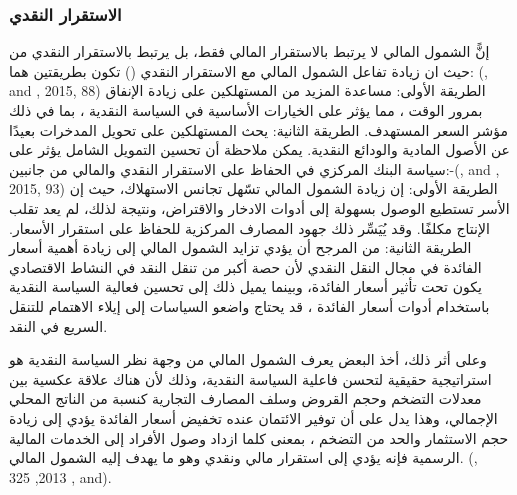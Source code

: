 \documentclass[10pt,a4paper]{report}
\begin{document}
\begin{doublespacing}
\subsubsection{الاستقرار النقدي}
إنًّ الشمول المالي لا يرتبط بالاستقرار المالي فقط، بل يرتبط بالاستقرار النقدي من حيث ان زيادة تفاعل الشمول المالي مع الاستقرار النقدي () تكون بطريقتين هما: (, and , 2015, 88) الطريقة الأولى: مساعدة المزيد من المستهلكين على زيادة الإنفاق بمرور الوقت ، مما يؤثر على الخيارات الأساسية في السياسة النقدية ، بما في ذلك مؤشر السعر المستهدف. الطريقة الثانية: يحث المستهلكين على تحويل المدخرات بعيدًا عن الأصول المادية والودائع النقدية. يمكن ملاحظة أن تحسين التمويل الشامل يؤثر على سياسة البنك المركزي في الحفاظ على الاستقرار النقدي والمالي من جانبين:-(, and , 2015, 93) الطريقة الأولى: إن زيادة الشمول المالي تسّهل تجانس الاستهلاك، حيث إن الأسر تستطيع الوصول بسهولة إلى أدوات الادخار والاقتراض، ونتيجة لذلك، لم يعد تقلب الإنتاج مكلفًا. وقد يُيَسِّر ذلك جهود المصارف المركزية للحفاظ على استقرار الأسعار. الطريقة الثانية: من المرجح أن يؤدي تزايد الشمول المالي إلى زيادة أهمية أسعار الفائدة في مجال النقل النقدي لأن حصة أكبر من تنقل النقد في النشاط الاقتصادي يكون تحت تأثير أسعار الفائدة، وبينما يميل ذلك إلى تحسين فعالية السياسة النقدية باستخدام أدوات أسعار الفائدة ، قد يحتاج واضعو السياسات إلى إيلاء الاهتمام للتنقل السريع في النقد. 

وعلى أثر ذلك، أخذ البعض يعرف الشمول المالي من وجهة نظر السياسة النقدية هو استراتيجية حقيقية لتحسن فاعلية السياسة النقدية، وذلك لأن هناك علاقة عكسية بين معدلات التضخم وحجم القروض وسلف المصارف التجارية كنسبة من الناتج المحلي الإجمالي، وهذا يدل على أن توفير الائتمان عنده تخفيض أسعار الفائدة يؤدي إلى زيادة حجم الاستثمار والحد من التضخم ، بمعنى كلما ازداد وصول الأفراد إلى الخدمات المالية الرسمية فإنه يؤدي إلى استقرار مالي ونقدي وهو ما يهدف إليه الشمول المالي. (, 2013, 325 , and).

\end{doublespacing}
\end{document}

